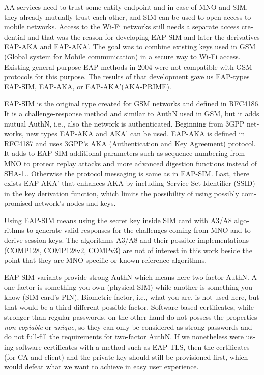 \documentclass[12pt,a4paper,english]{tutthesis}
\begin{document}
\begin{otherlanguage}{english}
AA services need to trust some entity endpoint and in case of MNO and
SIM, they already mutually trust each other, and SIM can be used 
to open access to mobile networks.
Access to the Wi-Fi networks still needs a separate access credential
and that was the reason for developing EAP-SIM and later the
derivatives EAP-AKA and EAP-AKA'.  The goal was to combine 
existing keys used in  GSM (Global system for Mobile communication)
in a secure way to Wi-Fi access. Existing general purpose EAP-methods in 2004 were not
compatible with GSM protocols for this purpose.\cite[p.93]{hav-doc}
The results of that development gave us EAP-types EAP-SIM, EAP-AKA, or
EAP-AKA'(AKA-PRIME).

EAP-SIM is the original type created for GSM networks and defined 
in RFC4186\cite{rfc4186}.
It is a challenge-response method and similar to AuthN used in GSM, 
but it adds mutual AuthN, i.e., also the network is authenticated.
Beginning from 3GPP networks, new types EAP-AKA and AKA' can be used.
EAP-AKA is defined in RFC4187\cite{rfc4187} and 
uses 3GPP's AKA (Authentication and Key Agreement) protocol.
It adds to EAP-SIM additional parameters such as
sequence numbering from MNO to protect replay attacks and more
advanced digestion functions instead of SHA-1.\cite{rfc5448}.
Otherwise the protocol messaging is same as in  EAP-SIM.
Last, there exists EAP-AKA' that enhances AKA by including Service Set
Identifier (SSID) 
in the key derivation function, which limits the possibility of using possibly
compromised network's nodes and keys. 


  Using EAP-SIM means using the secret key inside SIM card with A3/A8
algorithms to generate valid responses for the challenges coming from 
MNO and to derive session keys.  The algorithms A3/A8 and their
possible implementations (COMP128, COMP128v2, COMPv3) are not of
interest in this work beside the point that they are MNO specific or known reference algorithms.


EAP-SIM variants provide strong AuthN which means here two-factor
AuthN. A one factor  is something you own (physical SIM) while  
another
is  something you know (SIM card's PIN). Biometric factor, i.e., what you are,
is not used here, but that would be a third different possible factor.
Software based certificates, while stronger than regular passwords,
on the other hand do not possess the properties \emph{non-copiable} or
\emph{unique}, so they can only be considered as strong passwords and 
do not full-fill the requirements for two-factor AuthN.  If we nonetheless
were using software certificates with a method such as EAP-TLS, then the
certificates (for CA and client) and the private key should still be
provisioned first, which would defeat what we want to achieve in
easy user experience.



\end{otherlanguage}
\end{document}
